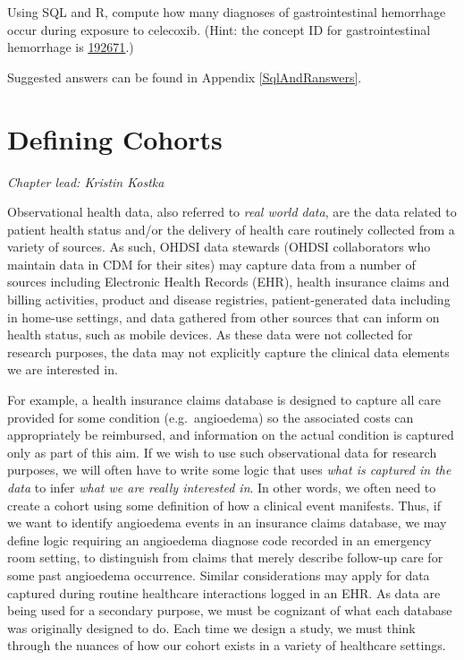 \documentclass[11pt]{book}
\theoremstyle{definition}
\theoremstyle{definition}
\theoremstyle{definition}
\theoremstyle{remark}
\begin{document}
\protect\hypertarget{exr:exerciseGiBleedsDuringCelecoxib}{}{\label{exr:exerciseGiBleedsDuringCelecoxib}
}Using SQL and R, compute how many diagnoses of gastrointestinal
hemorrhage occur during exposure to celecoxib. (Hint: the concept ID for
gastrointestinal hemorrhage is
\href{http://athena.ohdsi.org/search-terms/terms/192671}{192671}.)

Suggested answers can be found in Appendix \ref{SqlAndRanswers}.

\chapter{Defining Cohorts}\label{Cohorts}

\emph{Chapter lead: Kristin Kostka}

Observational health data, also referred to \emph{real world data}, are
the data related to patient health status and/or the delivery of health
care routinely collected from a variety of sources. As such, OHDSI data
stewards (OHDSI collaborators who maintain data in CDM for their sites)
may capture data from a number of sources including Electronic Health
Records (EHR), health insurance claims and billing activities, product
and disease registries, patient-generated data including in home-use
settings, and data gathered from other sources that can inform on health
status, such as mobile devices. As these data were not collected for
research purposes, the data may not explicitly capture the clinical data
elements we are interested in.

For example, a health insurance claims database is designed to capture
all care provided for some condition (e.g.~angioedema) so the associated
costs can appropriately be reimbursed, and information on the actual
condition is captured only as part of this aim. If we wish to use such
observational data for research purposes, we will often have to write
some logic that uses \emph{what is captured in the data} to infer
\emph{what we are really interested in}. In other words, we often need
to create a cohort using some definition of how a clinical event
manifests. Thus, if we want to identify angioedema events in an
insurance claims database, we may define logic requiring an angioedema
diagnose code recorded in an emergency room setting, to distinguish from
claims that merely describe follow-up care for some past angioedema
occurrence. Similar considerations may apply for data captured during
routine healthcare interactions logged in an EHR. As data are being used
for a secondary purpose, we must be cognizant of what each database was
originally designed to do. Each time we design a study, we must think
through the nuances of how our cohort exists in a variety of healthcare
settings.
\end{document}
